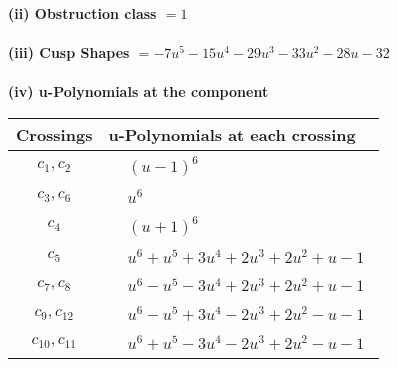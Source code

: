 \documentclass[1p]{elsarticle_modified}
\theoremstyle{definition}
\begin{document}
\flushleft \textbf{(ii) Obstruction class $= 1$}\\~\\
\flushleft \textbf{(iii) Cusp Shapes $= -7 u^5-15 u^4-29 u^3-33 u^2-28 u-32$}\\~\\
\newpage\renewcommand{\arraystretch}{1}
\flushleft \textbf{(iv) u-Polynomials at the component}\newline \\
\begin{tabular}{m{50pt}|m{274pt}}
Crossings & \hspace{64pt}u-Polynomials at each crossing \\
\hline $$\begin{aligned}c_{1},c_{2}\end{aligned}$$&$\begin{aligned}
&(u-1)^6
\end{aligned}$\\
\hline $$\begin{aligned}c_{3},c_{6}\end{aligned}$$&$\begin{aligned}
&u^6
\end{aligned}$\\
\hline $$\begin{aligned}c_{4}\end{aligned}$$&$\begin{aligned}
&(u+1)^6
\end{aligned}$\\
\hline $$\begin{aligned}c_{5}\end{aligned}$$&$\begin{aligned}
&u^6+u^5+3 u^4+2 u^3+2 u^2+u-1
\end{aligned}$\\
\hline $$\begin{aligned}c_{7},c_{8}\end{aligned}$$&$\begin{aligned}
&u^6- u^5-3 u^4+2 u^3+2 u^2+u-1
\end{aligned}$\\
\hline $$\begin{aligned}c_{9},c_{12}\end{aligned}$$&$\begin{aligned}
&u^6- u^5+3 u^4-2 u^3+2 u^2- u-1
\end{aligned}$\\
\hline $$\begin{aligned}c_{10},c_{11}\end{aligned}$$&$\begin{aligned}
&u^6+u^5-3 u^4-2 u^3+2 u^2- u-1
\end{aligned}$\\
\hline
\end{tabular}\\~\\
\end{document}
